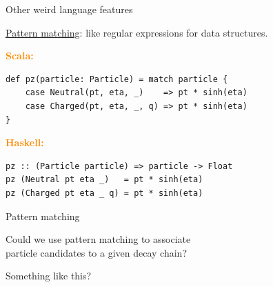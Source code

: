 \documentclass[aspectratio=169]{beamer}
\begin{document}

\begin{frame}[fragile]{Other weird language features}
\Large
\vspace{0.5 cm}

\underline{Pattern matching}: like regular expressions for data structures.

\vspace{0.5 cm}
\textcolor{darkorange}{\bf Scala:}

\begin{center}
\begin{minipage}{0.85\linewidth}
\normalsize
\begin{verbatim}
def pz(particle: Particle) = match particle {
    case Neutral(pt, eta, _)    => pt * sinh(eta)
    case Charged(pt, eta, _, q) => pt * sinh(eta)
}
\end{verbatim}
\end{minipage}
\end{center}

\vspace{0.5 cm}
\textcolor{darkorange}{\bf Haskell:}

\begin{center}
\begin{minipage}{0.85\linewidth}
\normalsize
\begin{verbatim}
pz :: (Particle particle) => particle -> Float
pz (Neutral pt eta _)   = pt * sinh(eta) 
pz (Charged pt eta _ q) = pt * sinh(eta)
\end{verbatim}
\end{minipage}
\end{center}
\end{frame}

\begin{frame}{Pattern matching}
\LARGE
\vspace{0.5 cm}
\begin{center}
Could we use pattern matching to associate \\ particle candidates to a given decay chain?
\end{center}
\end{frame}

\begin{frame}{Something like this?}



\end{frame}
\end{document}
